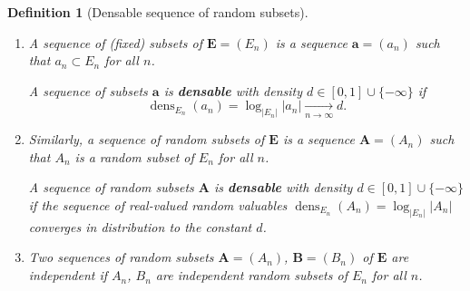 \documentclass{article}
\DeclareMathOperator{\dens}{dens}
\newcommand{\bs}{\boldsymbol}
\newcommand{\tendvers}{\xrightarrow[n\to\infty]{}}
\newtheorem{defi}[thm]{Definition}
\theoremstyle{remark}
\begin{document}
\begin{defi}[Densable sequence of random subsets]\quad
\begin{enumerate}[$(i)$]
    \item A sequence of (fixed) subsets of $\bs E = (E_n)$ is a sequence $\bs{a} = (a_n)$ such that $a_n\subset E_n$ for all $n$.
    
    A sequence of subsets $\bs{a}$ is \textbf{densable} with density $d \in [0,1]\cup \{-\infty\}$ if 
    \[\dens_{E_n}(a_n) = \log_{|E_n|}|a_n|\tendvers d.\]
    \item Similarly, a sequence of random subsets of $\bs E$ is a sequence $\bs{A} = (A_n)$ such that $A_n$ is a random subset of $E_n$ for all $n$.
    
    A sequence of random subsets $\bs{A}$ is \textbf{densable} with density $d\in [0,1]\cup \{-\infty\}$ if the sequence of real-valued random valuables $\dens_{E_n}(A_n) = \log_{|E_n|}|A_n|$ converges in distribution to the constant $d$. 

    \item Two sequences of random subsets $\bs A = (A_n)$, $\bs B = (B_n)$ of $\bs E$ are independent if $A_n$, $B_n$ are independent random subsets of $E_n$ for all $n$.
\end{enumerate}
\end{defi}\quad\\
\end{document}
